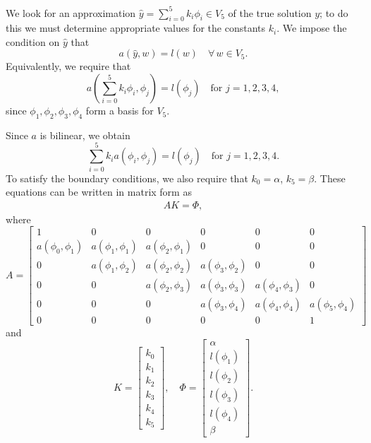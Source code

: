 We look for an approximation $\hat{y} = \sum_{i=0}^5 k_i \phi_i \in V_5$ of the true solution $y$; to do this we must determine appropriate values for the constants $k_i$.
We impose the condition on $\hat{y}$ that 
\[a(\hat{y},w) = l(w) \quad \forall \, w \in V_{5}.\]
Equivalently, we require that 
\[a \left( \sum_{i=0}^5 k_i \phi_i,\phi_j \right) = l(\phi_j) \quad \text{for } j = 1,2,3,4,\]
since $\phi_1, \phi_2, \phi_3, \phi_4$ form a basis for $V_{5}$.

Since $a$ is bilinear, we obtain 
\[\sum_{i=0}^5 k_i  a ( \phi_i,\phi_j ) = l(\phi_j) \quad \text{for } j = 1,2,3,4.\]
To satisfy the boundary conditions, we also require that $k_0 = \alpha$, $k_5 = \beta$.
These equations can be written in matrix form as
\begin{align} AK = \Phi,\label{eqn:FEM_linear_system}\end{align}
where
\[A = \left[\begin{array}{cccccc}1 & 0 & 0 & 0 & 0 & 0 \\a(\phi_0,\phi_1) & a(\phi_1,\phi_1) & a(\phi_2,\phi_1) & 0 & 0 & 0 \\0 & a(\phi_1,\phi_2) & a(\phi_2,\phi_2) & a(\phi_3,\phi_2) & 0 & 0 \\0 & 0 & a(\phi_2,\phi_3) & a(\phi_3,\phi_3) & a(\phi_4,\phi_3) & 0 \\0 & 0 & 0 & a(\phi_3,\phi_4) & a(\phi_4,\phi_4) & a(\phi_5,\phi_4) \\0 & 0 & 0 & 0 & 0 &1\end{array}\right]\]
and
\[K = \left[\begin{array}{c}k_0 \\k_1 \\k_2 \\k_3 \\k_4 \\k_5\end{array}\right] , \quad\Phi =  \left[\begin{array}{c}\alpha \\l(\phi_1) \\l(\phi_2) \\l(\phi_3) \\l(\phi_4) \\\beta\end{array}\right].\]

